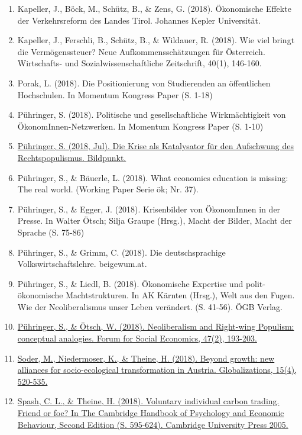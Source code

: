 \begin{enumerate}
	 \item Kapeller, J., Böck, M., Schütz, B., \& Zens, G. (2018). Ökonomische Effekte der Verkehrsreform des Landes Tirol. Johannes Kepler Universität.
	 \item Kapeller, J., Ferschli, B., Schütz, B., \& Wildauer, R. (2018). Wie viel bringt die Vermögenssteuer? Neue Aufkommensschätzungen für Österreich. Wirtschafts- und Sozialwissenschaftliche Zeitschrift, 40(1), 146-160.
	 \item Porak, L. (2018). Die Positionierung von Studierenden an öffentlichen Hochschulen. In Momentum Kongress Paper (S. 1-18)
	 \item Pühringer, S. (2018). Politische und gesellschaftliche Wirkmächtigkeit von ÖkonomInnen-Netzwerken. In Momentum Kongress Paper (S. 1-10)
	 \item \href{https://igbildendekunst.at/bildpunkt_/die-krise-als-katalysator-fuer-den-aufschwung-des-rechtspopulismus/}{Pühringer, S. (2018, Jul). Die Krise als Katalysator für den Aufschwung des Rechtspopulismus. Bildpunkt.}
	 \item Pühringer, S., \& Bäuerle, L. (2018). What economics education is missing: The real world. (Working Paper Serie ök; Nr. 37).
	 \item Pühringer, S., \& Egger, J. (2018). Krisenbilder von ÖkonomInnen in der Presse. In Walter Ötsch; Silja Graupe (Hrsg.), Macht der Bilder, Macht der Sprache (S. 75-86)
	 \item Pühringer, S., \& Grimm, C. (2018). Die deutschsprachige Volkswirtschaftslehre. beigewum.at.
	 \item Pühringer, S., \& Liedl, B. (2018). Ökonomische Expertise und polit-ökonomische Machtstrukturen. In AK Kärnten (Hrsg.), Welt aus den Fugen. Wie der Neoliberalismus unser Leben verändert. (S. 41-56). ÖGB Verlag.
	 \item \href{https://doi.org/10.1080/07360932.2018.1451765}{Pühringer, S., \& Ötsch, W. (2018). Neoliberalism and Right-wing Populism: conceptual analogies. Forum for Social Economics, 47(2), 193-203.}
	 \item \href{https://doi.org/10.1080/14747731.2018.1454680}{Soder, M., Niedermoser, K., \& Theine, H. (2018). Beyond growth: new alliances for socio-ecological transformation in Austria. Globalizations, 15(4), 520-535.}
	 \item \href{https://doi.org/10.1017/9781316676349.021}{Spash, C. L., \& Theine, H. (2018). Voluntary individual carbon trading. Friend or foe? In The Cambridge Handbook of Psychology and Economic Behaviour, Second Edition (S. 595-624). Cambridge University Press 2005.}

\end{enumerate}
